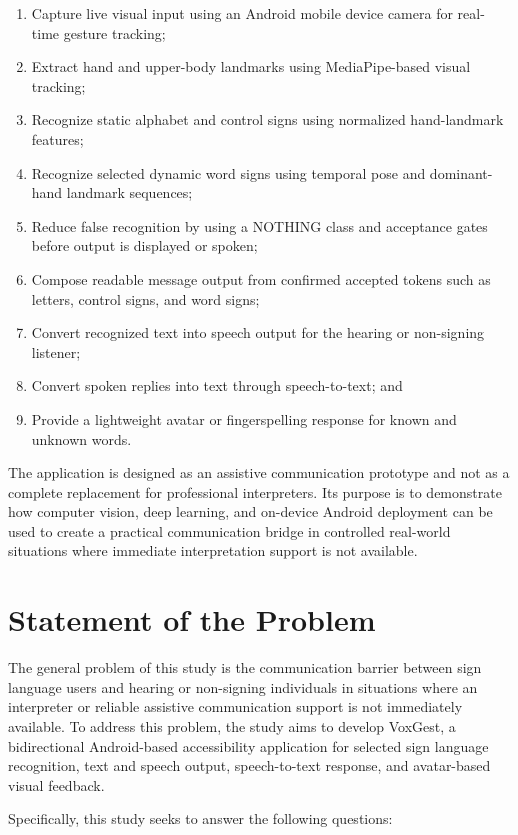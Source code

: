 \begin{enumerate}
    \item Capture live visual input using an Android mobile device camera for real-time gesture tracking;
    \item Extract hand and upper-body landmarks using MediaPipe-based visual tracking;
    \item Recognize static alphabet and control signs using normalized hand-landmark features;
    \item Recognize selected dynamic word signs using temporal pose and dominant-hand landmark sequences;
    \item Reduce false recognition by using a NOTHING class and acceptance gates before output is displayed or spoken;
    \item Compose readable message output from confirmed accepted tokens such as letters, control signs, and word signs;
    \item Convert recognized text into speech output for the hearing or non-signing listener;
    \item Convert spoken replies into text through speech-to-text; and
    \item Provide a lightweight avatar or fingerspelling response for known and unknown words.
\end{enumerate}

The application is designed as an assistive communication prototype and not as a complete replacement for professional interpreters. Its purpose is to demonstrate how computer vision, deep learning, and on-device Android deployment can be used to create a practical communication bridge in controlled real-world situations where immediate interpretation support is not available.

\section{Statement of the Problem}

The general problem of this study is the communication barrier between sign language users and hearing or non-signing individuals in situations where an interpreter or reliable assistive communication support is not immediately available. To address this problem, the study aims to develop VoxGest, a bidirectional Android-based accessibility application for selected sign language recognition, text and speech output, speech-to-text response, and avatar-based visual feedback.

Specifically, this study seeks to answer the following questions:

